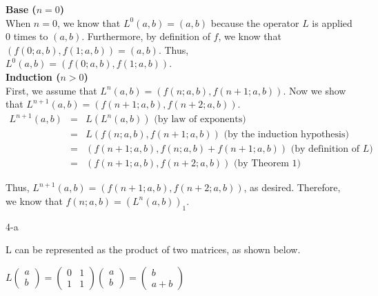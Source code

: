 \documentclass[11pt]{article}
\begin{document}
\begin{prob}{3}
\end{prob}
\begin{sol}

\textbf{Base ($n = 0$)} \\
When $n = 0$, we know that $L^{0}(a,b) = (a,b)$ because the operator $L$ is applied $0$ times to $(a,b)$. Furthermore, by definition of $f$, we know that $(f(0;a,b), f(1;a,b)) = (a,b)$. Thus, $L^{0}(a,b) = (f(0;a,b), f(1;a,b))$. \\

\textbf{Induction ($n > 0$)} \\
First, we assume that $L^{n}(a,b) = (f(n;a,b),f(n + 1;a,b))$. Now we show that $L^{n+1}(a,b) = (f(n + 1;a,b),f(n + 2;a,b))$.
\begin{eqnarray*}
L^{n + 1}(a,b) & = & L(L^{n}(a,b)) \text{ (by law of exponents)}\\
& = & L(f(n;a,b),f(n + 1;a,b)) \text{ (by the induction hypothesis)} \\
& = & (f(n + 1;a,b), f(n;a,b) + f(n + 1;a,b)) \text{ (by definition of $L$)} \\
& = & (f(n + 1;a,b), f(n + 2;a,b)) \text{ (by Theorem 1)}
\end{eqnarray*}

Thus, $L^{n+1}(a,b) = (f(n + 1;a,b),f(n + 2;a,b))$, as desired. Therefore, we know that $f(n;a,b) = (L^{n}(a,b))_{1}$.

\end{sol}

\begin{prob}{4-a}
\end{prob}
\begin{sol}

L can be represented as the product of two matrices, as shown below.
\begin{center}
$L\begin{pmatrix} a \\ b \end{pmatrix} = \begin{pmatrix} 0 & 1 \\ 1 & 1 \end{pmatrix} \begin{pmatrix} a \\ b \end{pmatrix} = \begin{pmatrix} b \\ a+b \end{pmatrix}$
\end{center}
\end{sol}
\end{document}
